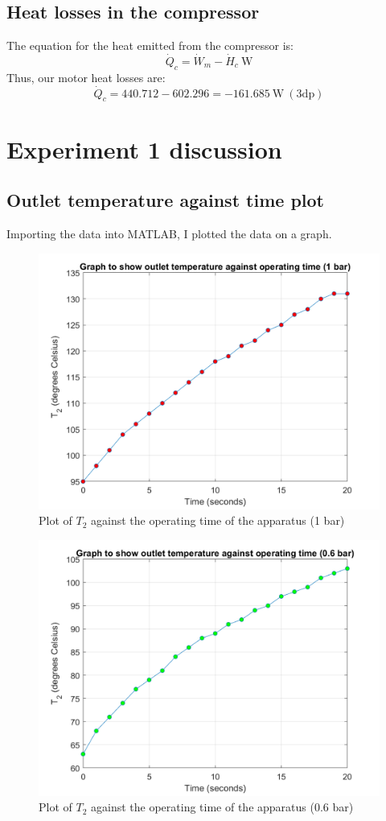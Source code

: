 \documentclass[class=article, crop=false, 12pt,a4paper]{standalone}
\numberwithin{equation}{section}
\begin{document}
\subsection{Heat losses in the compressor}
The equation for the heat emitted from the compressor is:
\begin{equation}
  \dot{Q}_c = \dot{W}_m - \dot{H}_c \ \si{\watt}
  \label{heatlosscompressor}
\end{equation}
Thus, our motor heat losses are:
\begin{equation} 
  \dot{Q}_c = 440.712 - 602.296 = -161.685 \ \si{\watt} \ (3\textrm{dp}) 
\end{equation}
\section{Experiment 1 discussion}
\subsection{Outlet temperature against time plot}
Importing the data into MATLAB, I plotted the data on a graph.
\begin{figure}
  \includegraphics[width = 0.9 \textwidth]{./img/T21vsTimeGraph}
  \caption{Plot of \(T_2\) against the operating time of the apparatus (1 bar)}
  \label{ref:T21vsTime1bar}
\end{figure}
\begin{figure}
  \includegraphics[width = 0.9 \textwidth]{./img/T206vsTimeGraph}
  \caption{Plot of \(T_2\) against the operating time of the apparatus (0.6 bar)}
  \label{ref:T206vsTime1bar}
\end{figure}
\end{document}
